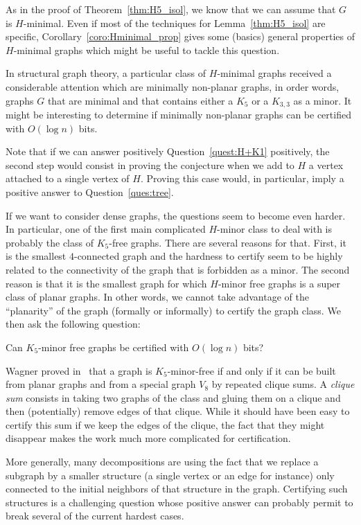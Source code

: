 \documentclass[a4paper,thm-restate,USenglish]{lipics-v2019}
\begin{document}
As in the proof of Theorem~\ref{thm:H5_isol}, we know that we can assume that $G$ is $H$-minimal.
Even if most of the techniques for Lemma~\ref{thm:H5_isol} are specific, Corollary~\ref{coro:Hminimal_prop} gives some (basics) general properties of $H$-minimal graphs which might be useful to tackle this question. 

In structural graph theory, a particular class of $H$-minimal graphs received a considerable attention which are minimally non-planar graphs, in order words, graphs $G$ that are minimal and that contains either a $K_5$ or a $K_{3,3}$ as a minor. It might be interesting to determine if minimally non-planar graphs can be certified with $O(\log n)$ bits.

Note that if we can answer positively Question~\ref{quest:H+K1} positively, the second step would consist in proving the conjecture when we add to $H$ a vertex attached to a single vertex of $H$. Proving this case would, in particular, imply a positive answer to Question~\ref{ques:tree}.


If we want to consider dense graphs, the questions seem to become even harder. In particular, one of the first main complicated $H$-minor class to deal with is probably the class of $K_5$-free graphs. There are several reasons for that. First, it is the smallest $4$-connected graph  and the hardness to certify seem to be highly related to the connectivity of the graph that is forbidden as a minor. The second reason is that it is the smallest graph for which $H$-minor free graphs is a super class of planar graphs.  In other words, we cannot take advantage of the ``planarity'' of the graph (formally or informally) to certify the graph class. 
We then ask the following question:

\begin{question}
Can $K_5$-minor free graphs be certified with $O(\log n)$ bits?
\end{question}

Wagner proved in~\cite{Wagner} that a graph is $K_5$-minor-free if and only if it can be built from planar graphs and from a special graph $V_8$ by repeated clique sums. A \emph{clique sum} consists in taking two graphs of the class and gluing them on a clique and then (potentially) remove edges of that clique. While it should have been easy to certify this sum if we keep the edges of the clique, the fact that they might disappear makes the work much more complicated for certification.

More generally, many decompositions are using the fact that we replace a subgraph by a smaller structure (a single vertex or an edge for instance) only connected to the initial neighbors of that structure in the graph. Certifying such structures is a challenging question whose positive answer can probably permit to break several of the current hardest cases.
\end{document}
